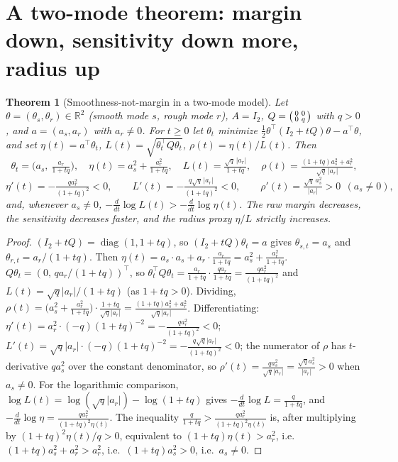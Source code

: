 \documentclass[11pt]{article}
\newtheorem{theorem}{Theorem}
\theoremstyle{definition}
\newcommand{\R}{\mathbb{R}}
\begin{document}
\section{A two-mode theorem: margin down, sensitivity down more, radius up}
\begin{theorem}[Smoothness-not-margin in a two-mode model]\label{thm:two-mode-smoothness}
Let $\theta=(\theta_s,\theta_r)\in\R^2$ (smooth mode $s$, rough mode $r$), $A=I_2$,
$Q=\begin{psmallmatrix}0&0\\0&q\end{psmallmatrix}$ with $q>0$, and $a=(a_s,a_r)$ with $a_r\neq0$. For $t\ge0$
let $\theta_t$ minimize $\tfrac12\theta^\top(I_2+tQ)\theta-a^\top\theta$, and set $\eta(t)=a^\top\theta_t$,
$L(t)=\sqrt{\theta_t^\top Q\theta_t}$, $\rho(t)=\eta(t)/L(t)$. Then
\[
\theta_t=\Big(a_s,\ \tfrac{a_r}{1+tq}\Big),\quad
\eta(t)=a_s^2+\tfrac{a_r^2}{1+tq},\quad
L(t)=\tfrac{\sqrt q\,|a_r|}{1+tq},\quad
\rho(t)=\tfrac{(1+tq)a_s^2+a_r^2}{\sqrt q\,|a_r|},
\]
\[
\eta'(t)=-\tfrac{q a_r^2}{(1+tq)^2}<0,\qquad L'(t)=-\tfrac{q\sqrt q\,|a_r|}{(1+tq)^2}<0,\qquad
\rho'(t)=\tfrac{\sqrt q\,a_s^2}{|a_r|}>0\ \ (a_s\neq0),
\]
and, whenever $a_s\neq0$, $-\tfrac{d}{dt}\log L(t)>-\tfrac{d}{dt}\log\eta(t)$. The raw margin decreases, the
sensitivity decreases faster, and the radius proxy $\eta/L$ strictly increases.
\end{theorem}
\begin{proof}
$(I_2+tQ)=\operatorname{diag}(1,1+tq)$, so $(I_2+tQ)\theta_t=a$ gives $\theta_{s,t}=a_s$ and
$\theta_{r,t}=a_r/(1+tq)$. Then $\eta(t)=a_s\cdot a_s+a_r\cdot\tfrac{a_r}{1+tq}=a_s^2+\tfrac{a_r^2}{1+tq}$.
$Q\theta_t=(0,\,q a_r/(1+tq))^\top$, so $\theta_t^\top Q\theta_t=\tfrac{a_r}{1+tq}\cdot\tfrac{q a_r}{1+tq}=\tfrac{q a_r^2}{(1+tq)^2}$
and $L(t)=\sqrt q|a_r|/(1+tq)$ (as $1+tq>0$). Dividing,
$\rho(t)=\big(a_s^2+\tfrac{a_r^2}{1+tq}\big)\cdot\tfrac{1+tq}{\sqrt q|a_r|}=\tfrac{(1+tq)a_s^2+a_r^2}{\sqrt q|a_r|}$.
Differentiating: $\eta'(t)=a_r^2\cdot(-q)(1+tq)^{-2}=-\tfrac{q a_r^2}{(1+tq)^2}<0$;
$L'(t)=\sqrt q|a_r|\cdot(-q)(1+tq)^{-2}=-\tfrac{q\sqrt q|a_r|}{(1+tq)^2}<0$; the numerator of $\rho$ has $t$-derivative
$q a_s^2$ over the constant denominator, so $\rho'(t)=\tfrac{q a_s^2}{\sqrt q|a_r|}=\tfrac{\sqrt q a_s^2}{|a_r|}>0$ when $a_s\neq0$.
For the logarithmic comparison, $\log L(t)=\log(\sqrt q|a_r|)-\log(1+tq)$ gives $-\tfrac{d}{dt}\log L=\tfrac{q}{1+tq}$,
and $-\tfrac{d}{dt}\log\eta=\tfrac{q a_r^2}{(1+tq)^2\eta(t)}$. The inequality $\tfrac{q}{1+tq}>\tfrac{q a_r^2}{(1+tq)^2\eta(t)}$
is, after multiplying by $(1+tq)^2\eta(t)/q>0$, equivalent to $(1+tq)\eta(t)>a_r^2$, i.e.\
$(1+tq)a_s^2+a_r^2>a_r^2$, i.e.\ $(1+tq)a_s^2>0$, i.e.\ $a_s\neq0$.
\end{proof}
\end{document}
